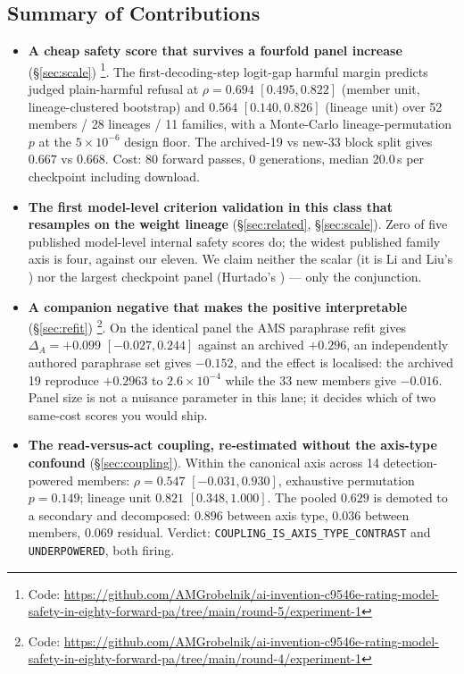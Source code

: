 \documentclass[11pt,letterpaper]{article}
\begin{document}
\subsection{Summary of Contributions}

\begin{itemize}
\item \textbf{A cheap safety score that survives a fourfold panel increase} (\S\ref{sec:scale}) \footnote{Code: \url{https://github.com/AMGrobelnik/ai-invention-c9546e-rating-model-safety-in-eighty-forward-pa/tree/main/round-5/experiment-1}}. The first-decoding-step logit-gap harmful margin predicts judged plain-harmful refusal at $\rho = 0.694$ $[0.495, 0.822]$ (member unit, lineage-clustered bootstrap) and $0.564$ $[0.140, 0.826]$ (lineage unit) over 52 members / 28 lineages / 11 families, with a Monte-Carlo lineage-permutation $p$ at the $5\times10^{-6}$ design floor. The archived-19 vs new-33 block split gives $0.667$ vs $0.668$. Cost: 80 forward passes, 0 generations, median 20.0\,s per checkpoint including download.
\item \textbf{The first model-level criterion validation in this class that resamples on the weight lineage} (\S\ref{sec:related}, \S\ref{sec:scale}). Zero of five published model-level internal safety scores do; the widest published family axis is four, against our eleven. We claim neither the scalar (it is Li and Liu's \citep{LiLiu2025}) nor the largest checkpoint panel (Hurtado's \citep{Hurtado2026}) --- only the conjunction.
\item \textbf{A companion negative that makes the positive interpretable} (\S\ref{sec:refit}) \footnote{Code: \url{https://github.com/AMGrobelnik/ai-invention-c9546e-rating-model-safety-in-eighty-forward-pa/tree/main/round-4/experiment-1}}. On the identical panel the AMS paraphrase refit gives $\Delta_A = +0.099$ $[-0.027, 0.244]$ against an archived $+0.296$, an independently authored paraphrase set gives $-0.152$, and the effect is localised: the archived 19 reproduce $+0.2963$ to $2.6\times10^{-4}$ while the 33 new members give $-0.016$. Panel size is not a nuisance parameter in this lane; it decides which of two same-cost scores you would ship.
\item \textbf{The read-versus-act coupling, re-estimated without the axis-type confound} (\S\ref{sec:coupling}). Within the canonical axis across 14 detection-powered members: $\rho = 0.547$ $[-0.031, 0.930]$, exhaustive permutation $p = 0.149$; lineage unit $0.821$ $[0.348, 1.000]$. The pooled $0.629$ is demoted to a secondary and decomposed: $0.896$ between axis type, $0.036$ between members, $0.069$ residual. Verdict: \texttt{COUPLING\_IS\_AXIS\_TYPE\_CONTRAST} and \texttt{UNDERPOWERED}, both firing.

\end{itemize}
\end{document}
